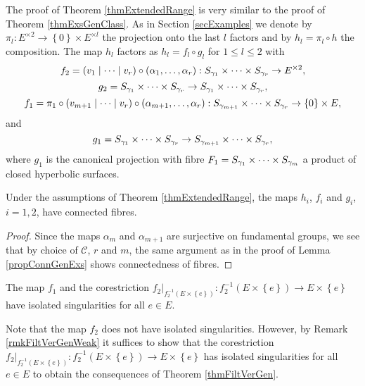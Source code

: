 The proof of Theorem \ref{thmExtendedRange} is very similar to the proof of Theorem \ref{thmExsGenClass}. As in Section \ref{secExamples} we denote by $\pi_l : E^{\times 2}\to \left\{ 0 \right\} \times E^{\times l}$ the projection onto the last $l$ factors and by $h_l=\pi_l\circ h$ the composition. The map $h_l$ factors as $h_l = f_l \circ g_l$ for $1\leq l \leq 2$ with
\[
 f_2=\left(v_1\mid \dots \mid v_r \right) \circ \left(\alpha_1, \dots, \alpha_r \right) : S_{\gamma_1}\times \dots \times S_{\gamma_r}\to  E^{\times 2},
\]
\[
 g_2= S_{\gamma_1}\times \dots \times S_{\gamma_r} \to S_{\gamma_{1}}\times \dots \times S_{\gamma_r},
\]
\[
 f_1=\pi_1 \circ \left(v_{m+1}\mid \dots \mid v_r \right) \circ \left(\alpha_{m+1}, \dots, \alpha_r \right) : S_{\gamma_{m+1}}\times \dots \times S_{\gamma_r}\to  \left\{0\right\} \times E,
\]
and
\[
 g_1= S_{\gamma_1}\times \dots \times S_{\gamma_r} \to S_{\gamma_{m+1}}\times \dots \times S_{\gamma_r},
\]
where $g_1$ is the canonical projection with fibre $F_1=S_{\gamma_1}\times \dots \times S_{\gamma_m}$ a product of closed hyperbolic surfaces.

\begin{lemma}
\label{lemConnGenExsExt}
 Under the assumptions of Theorem \ref{thmExtendedRange}, the maps $h_i$, $f_i$ and $g_i$, $i=1,2$, have connected fibres.
\end{lemma}
\begin{proof}
 Since the maps $\alpha_m$ and $\alpha_{m+1}$ are surjective on fundamental groups, we see that by choice of $\mathcal{C}$, $r$ and $m$, the same argument as in the proof of Lemma \ref{propConnGenExs} shows connectedness of fibres.
\end{proof}



\begin{lemma}
 The map $f_1$ and the corestriction $f_2|_{f_2^{-1}(E\times \left\{e\right\})} : f_2^{-1}(E\times \left\{e\right\}) \to E\times \left\{ e \right\}$ have isolated singularities for all $e\in E$. 
 \label{lemIsSingExt}
\end{lemma}

Note that the map $f_2$ does not have isolated singularities. However, by Remark \ref{rmkFiltVerGenWeak} it suffices to show that the corestriction $f_2|_{f_2^{-1}(E\times \left\{e\right\})} : f_2^{-1}(E\times \left\{e\right\}) \to E\times \left\{ e \right\}$ has isolated singularities for all $e\in E$ to obtain the consequences of Theorem \ref{thmFiltVerGen}.

